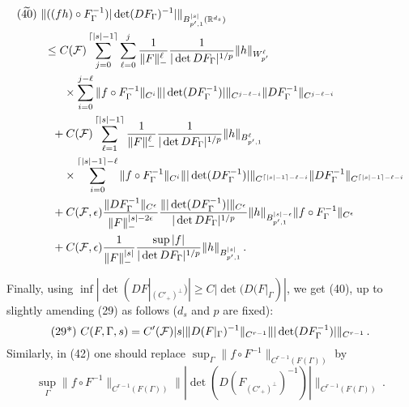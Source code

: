 \documentclass[10pt,twoside]{amsart}
\begin{document}
 \begin{align*}
(\widetilde {40})\,\, 
&\| ((fh) \circ F_\Gamma^{-1}) |\det( DF_\Gamma)^{-1}|\|_{B^{|s|}_{p',1}(\mathbb{R}^{d_s})}\\
 &\,\, \le 
C(\mathcal{F})\sum_{j=0}^{\lceil |s|-1\rceil}
\sum_{\ell=0}^j
\frac{1}{\|F\|_-^\ell} \frac{1} {|\det DF_\Gamma|^{1/p}} \|h\|_{W^{\ell}_{p'}}\\
&\qquad\times
\sum_{i=0}^{j-\ell} \| f \circ F_\Gamma^{-1}\|_{C^i} 
\||\det (DF_\Gamma ^{-1})|\|_{C^{j-\ell-i}}
\|DF_\Gamma^{-1}\|_{C^{j-\ell-i}} \\
&\quad
+C(\mathcal{F})\sum_{\ell=1}^{\lceil |s|-1 \rceil}
\frac{1}{\|F\|_-^\ell} \frac{1} {|\det DF_\Gamma|^{1/p}} \|h\|_{B^{\ell}_{p',1}}\\
&\qquad\times
\sum_{i=0}^{\lceil |s|-1 \rceil-\ell} \| f \circ F_\Gamma^{-1}\|_{C^i} 
\||\det (DF_\Gamma ^{-1})|\|_{C^{\lceil |s|-1 \rceil-\ell-i}}
\|DF_\Gamma^{-1}\|_{C^{\lceil |s|-1 \rceil-\ell-i}}\\
&\quad
+C(\mathcal{F}, \epsilon)\frac{\|DF_\Gamma^{-1}\|_{C^{\epsilon}}}{\|F\|_-^{|s|-2\epsilon}} \frac{\||\det (DF_\Gamma^{-1})|\|_{C^{\epsilon}}} {|\det DF_\Gamma|^{1/p}} \|h\|_{B^{|s|-\epsilon}_{p',1}}
\| f \circ F_\Gamma^{-1}\|_{C^\epsilon} 
\\
&\quad
+C(\mathcal{F}, \epsilon)\frac{1}{\|F\|_-^{|s|}} \frac{\sup|f|} {|\det DF_\Gamma|^{1/p}} \|h\|_{B^{|s|}_{p',1}} \, .
\end{align*}


Finally, using $\inf | \det (DF |_{(C'_+)^\perp})| \ge C  | \det (D (F |_{\Gamma})|$,  we get
 (40), up to slightly amending (29) as follows ($d_s$ and $p$ are fixed):
\begin{equation*}
\mbox{(29*)} \, \,
C(F, \Gamma, s)= 
C'(\mathcal{F})|s| \|D(F|_\Gamma)^{-1}\|_{C^{r-1}} \||\det (DF_\Gamma^{-1})|\|_{C^{r-1}}\, .
\end{equation*}
Similarly,   in (42) one should replace $\sup_\Gamma \|f \circ F^{-1}\|_{C^{r-1}(F(\Gamma))}$ 
by 
$$\sup_\Gamma \|f \circ F^{-1}\|_{C^{r-1}(F(\Gamma))} \||\det (D (F_{(C'_+)^\perp})^{-1})|\|_{C^{r-1}(F(\Gamma))}\, .
$$




\iffalse
(An alternative proof of the bound  can be obtained by exploiting
the decomposition into  compact plus bounded
operators from \cite{BT, BT1}: 
in particular the proof\footnote{See also  \cite[Lemma 7]{NS}
 using \cite[(15), comment after (19)]{BT}. This also works for $s<0$.} of \cite[(6.11)]{BT1}.)
\fi
\end{document}
